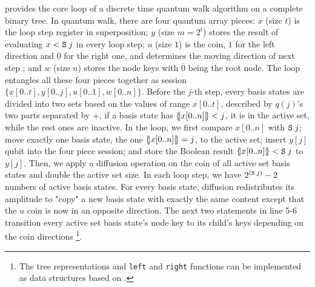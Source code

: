  provides the core loop of a discrete time quantum walk algorithm on a complete binary tree. In quantum walk, there are four quantum array pieces: $x$ (size $t$) is the loop step register in superposition; $y$ (size $m=2^t$) stores the result of evaluating $x<\texttt{S}\;j$ in every loop step; $u$ (size $1$) is the coin, $1$ for the left direction and $0$ for the right one, and determines the moving direction of next step ; and $w$ (size $n$) stores the node keys with $\overline{0}$ being the root node. The loop entangles all these four pieces together as session $\{x[0..t],y[0..j],u[0..1],w[0..n]\}$. 
Before the $j$-th step, every basis states are divided into two sets based on the values of range $x[0..t]$, described by $q(j)$'s two parts separated by $+$, if a basis state has $\{\hspace{-0.2em}| x[0..n] |\hspace{-0.2em}\}<j$, it is in the active set, while the rest ones are inactive. In the loop, we first compare $x[0..n]$ with $\texttt{S}\;j$; move exactly one basis state, the one $\{\hspace{-0.2em}| x[0..n] |\hspace{-0.2em}\}=j$, to the active set; insert $y[j]$ qubit into the four piece session; and store the Boolean result $\{\hspace{-0.2em}| x[0..n] |\hspace{-0.2em}\}<\texttt{S}\;j$ to $y[j]$.
Then, we apply a diffusion operation on the coin of all active set basis states and double the active set size. In each loop step, we have $2^{(\texttt{S}\;j)}-2$ numbers of active basis states.
For every basis state, diffusion redistributes its amplitude to "copy" a new basis state with exactly the same content except that the $u$ coin is now in an opposite direction. 
The next two statements in  line 5-6 transition every active set basis state's node key to its child's keys depending on the coin directions \footnote{The tree representations and \texttt{left} and \texttt{right} functions can be implemented as data structures based on \oqasm.}.

